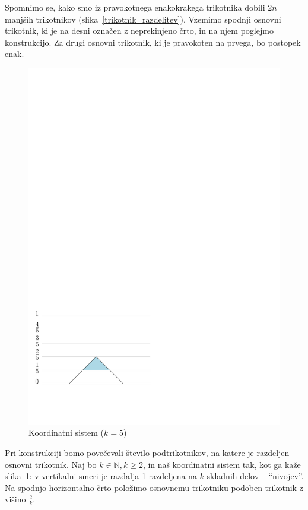\documentclass[a4paper, 12pt]{article}
\begin{document}
Spomnimo se, kako smo iz pravokotnega enakokrakega trikotnika dobili $ 2n $ manjših trikotnikov (slika~\ref{trikotnik_razdelitev}). Vzemimo spodnji osnovni trikotnik, ki je na desni označen z neprekinjeno črto, in na njem poglejmo konstrukcijo. Za drugi osnovni trikotnik, ki je pravokoten na prvega, bo postopek enak.

\begin{figure}
    \includegraphics[width=0.9\linewidth]{ipe_slike/k_5.pdf}
    \caption{Koordinatni sistem ($ k = 5 $)}
    \label{sistem5}
\end{figure}

Pri konstrukciji bomo povečevali število podtrikotnikov, na katere je razdeljen osnovni trikotnik. Naj bo $ k \in \mathbb{N}, k \geq 2 $, in naš koordinatni sistem tak, kot ga kaže slika~\ref{sistem5}: v vertikalni smeri je razdalja 1 razdeljena na $ k $ skladnih delov -- ``nivojev''. Na spodnjo horizontalno črto položimo osnovnemu trikotniku podoben trikotnik z višino $ \frac{2}{k} $.
\end{document}
